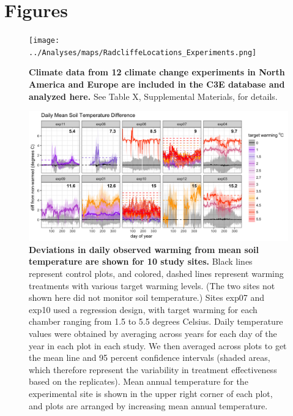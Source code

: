 \documentclass{article}
\begin{document}
\section* {Figures}


\begin{figure}[p]
\centering
\texttt{[image: ../Analyses/maps/RadcliffeLocations\_Experiments.png]} 
\caption{\textbf{Climate data from 12 climate change experiments in North America and Europe are included in the C3E database and analyzed here.} See Table X, Supplemental Materials, for details.} 
 \label{fig:map}
 \end{figure}
\clearpage
\begin{figure}[h]
\centering
 \includegraphics{../Analyses/figures/Exploratory_TimeSeries_SoilTemp1Mean_Deviation.png}
 \caption{\textbf{Deviations in daily observed warming from mean soil temperature are shown for 10 study sites.} Black lines represent control plots, and colored, dashed lines represent warming treatments with various target warming levels. (The two sites not shown here did not monitor soil temperature.) Sites exp07 and exp10 used a regression design, with target warming for each chamber ranging from 1.5 to 5.5 degrees Celsius. Daily temperature values were obtained by averaging across years for each day of the year in each plot in each study. We then averaged across plots to get the mean line and 95 percent confidence intervals (shaded areas, which therefore represent the variability in treatment effectiveness based on the replicates). Mean annual temperature for the experimental site is shown in the upper right corner of each plot, and plots are arranged by increasing mean annual temperature.}
 \label{fig:effwarm}

 \end{figure}
\end{document}
